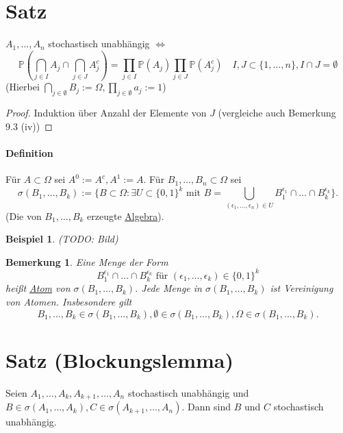 \documentclass[a4paper,11pt,notitlepage]{report}
\newtheorem{remark}{Bemerkung}[chapter]
\newtheorem{example}{Beispiel}[chapter]
\newcommand{\Prim}{{\ensuremath{\mathbb{P}}}}
\begin{document}
\section{Satz}
$A_1, \ldots, A_n$ stochastisch unabhängig $\Leftrightarrow$
$$\Prim(\bigcap\limits_{j \in I}{A_j} \cap \bigcap\limits_{j \in J}{A_j^c}) = \prod\limits_{j \in I}{\Prim(A_j)} \prod\limits_{j \in J}{\Prim(A_j^c)} \quad I,J \subset \{1, \ldots, n\}, I \cap J = \emptyset$$
(Hierbei $\bigcap\limits_{j \in \emptyset}{B_j}:= \Omega, \prod\limits_{j \in \emptyset}{a_j}:=1$)

\begin{proof}
	Induktion über Anzahl der Elemente von $J$ (vergleiche auch Bemerkung 9.3 (iv))
\end{proof}

\paragraph{Definition}
Für $A \subset \Omega$ sei $A^0 := A^c, A^1 := A$.
\newline
Für $B_1, \ldots, B_n \subset \Omega$ sei
$$\sigma(B_1, \ldots, B_k):=\{B \subset \Omega \colon \exists U \subset \{0,1\}^k \text{ mit } B = \bigcup\limits_{(\epsilon_1, \ldots, \epsilon_n) \in U}{B_1^{\epsilon_1} \cap \ldots \cap B_k^{\epsilon_k}}\}.$$
(Die von $B_1, \ldots, B_k$ erzeugte \underline{Algebra}).

\begin{example}
	(TODO: Bild)
\end{example}

\begin{remark}
	Eine Menge der Form
	$$B_1^{\epsilon_1} \cap \ldots \cap B_k^{\epsilon_k} \text{ für } (\epsilon_1, \ldots, \epsilon_k) \in \{0,1\}^k$$
	heißt \underline{Atom} von $\sigma(B_1, \ldots, B_k)$. Jede Menge in $\sigma(B_1, \ldots, B_k)$ ist Vereinigung von Atomen. Insbesondere gilt
	$$B_1, \ldots, B_k \in \sigma(B_1, \ldots, B_k), \emptyset \in \sigma(B_1, \ldots, B_k), \Omega \in \sigma(B_1, \ldots, B_k).$$
\end{remark}

\section{Satz (Blockungslemma)} \label{block}
Seien $A_1, \ldots, A_k, A_{k+1}, \ldots, A_n$ stochastisch unabhängig und \newline $B \in \sigma(A_1, \ldots, A_k), C \in \sigma(A_{k+1}, \ldots, A_n)$. Dann sind $B$ und $C$ stochastisch unabhängig.
\end{document}
